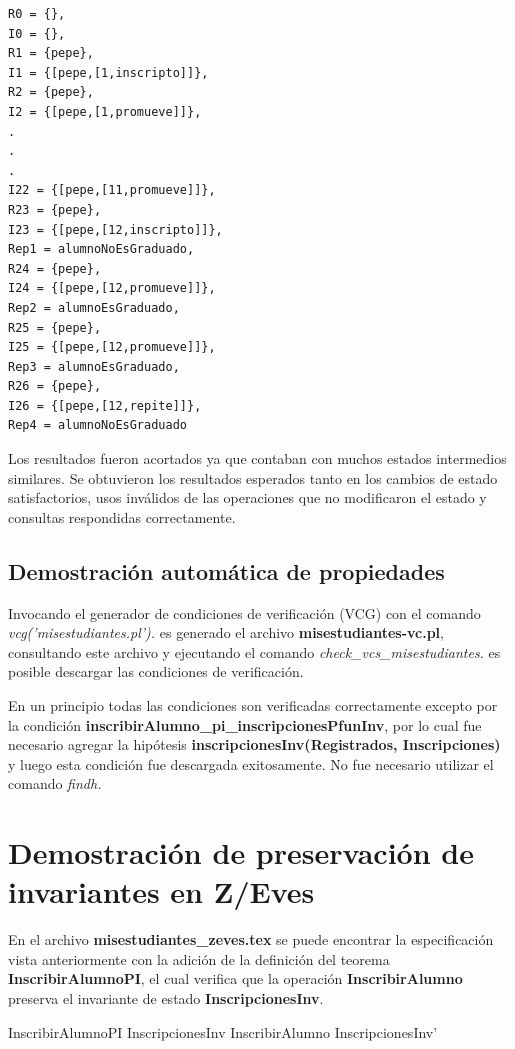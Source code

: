 \documentclass{article}
\begin{document}
\begin{verbatim}
R0 = {},  
I0 = {},  
R1 = {pepe},  
I1 = {[pepe,[1,inscripto]]},  
R2 = {pepe},  
I2 = {[pepe,[1,promueve]]},  
.
.
.
I22 = {[pepe,[11,promueve]]},  
R23 = {pepe},  
I23 = {[pepe,[12,inscripto]]},  
Rep1 = alumnoNoEsGraduado,  
R24 = {pepe},  
I24 = {[pepe,[12,promueve]]},  
Rep2 = alumnoEsGraduado,  
R25 = {pepe},  
I25 = {[pepe,[12,promueve]]},  
Rep3 = alumnoEsGraduado,  
R26 = {pepe},  
I26 = {[pepe,[12,repite]]},  
Rep4 = alumnoNoEsGraduado
\end{verbatim}

Los resultados fueron acortados ya que contaban con muchos estados intermedios similares. Se obtuvieron los resultados esperados tanto en los cambios de estado satisfactorios, usos inválidos de las operaciones que no modificaron el estado y consultas respondidas correctamente.

\subsection{Demostración automática de propiedades}
Invocando el generador de condiciones de verificación (VCG) con el comando \emph{vcg('misestudiantes.pl').} es generado el archivo \textbf{misestudiantes-vc.pl}, consultando este archivo y ejecutando el comando \emph{check\_vcs\_misestudiantes.} es posible descargar las condiciones de verificación.

En un principio todas las condiciones son verificadas correctamente excepto por la condición \textbf{inscribirAlumno\_pi\_inscripcionesPfunInv}, por lo cual fue necesario agregar la hipótesis \textbf{inscripcionesInv(Registrados, Inscripciones)} y luego esta condición fue descargada exitosamente. No fue necesario utilizar el comando \emph{findh.}

\section{Demostración de preservación de invariantes en Z/Eves}
En el archivo \textbf{misestudiantes\_zeves.tex} se puede encontrar la especificación vista anteriormente con la adición de la definición del teorema \textbf{InscribirAlumnoPI}, el cual verifica que la operación \textbf{InscribirAlumno} preserva el invariante de estado \textbf{InscripcionesInv}.
\begin{theorem}{InscribirAlumnoPI}
  InscripcionesInv \land InscribirAlumno \implies InscripcionesInv'
\end{theorem}
\end{document}
